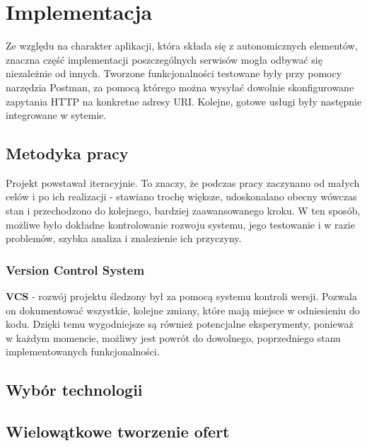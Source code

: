 \chapter{Implementacja}
\label{cha:implementacja}

Ze względu na charakter aplikacji, która składa się z autonomicznych elementów, znaczna część implementacji poszczególnych serwisów mogła odbywać się niezależnie od innych. Tworzone funkcjonalności testowane były przy pomocy narzędzia Postman, za pomocą którego można wysyłać dowolnie skonfigurowane zapytania HTTP na konkretne adresy URI. Kolejne, gotowe usługi były następnie integrowane w sytemie.


\section{Metodyka pracy}
Projekt powstawał iteracyjnie. To znaczy, że podczas pracy zaczynano od małych celów i po ich realizacji - stawiano trochę większe, udoskonalano obecny wówczas stan i przechodzono do kolejnego, bardziej zaawansowanego kroku. W ten sposób, możliwe było dokładne kontrolowanie rozwoju systemu, jego testowanie i w razie problemów, szybka analiza i znalezienie ich przyczyny. 

\subsection{Version Control System}
\textbf{VCS} - rozwój projektu śledzony był za pomocą systemu kontroli wersji.
Pozwala on dokumentować wszystkie, kolejne zmiany, które mają miejsce w odniesieniu do kodu. Dzięki temu wygodniejsze są również potencjalne eksperymenty, ponieważ w każdym momencie, możliwy jest powrót do dowolnego, poprzedniego stanu implementowanych funkcjonalności.\cite{vcs}



\section{Wybór technologii}


\section{Wielowątkowe tworzenie ofert}

